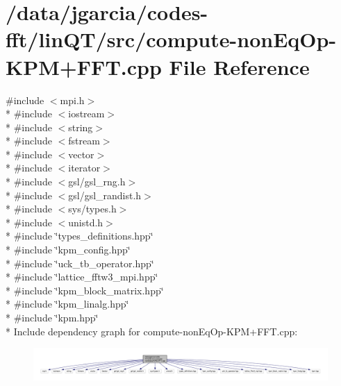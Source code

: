 \hypertarget{compute-nonEqOp-KPM_09FFT_8cpp}{}\section{/data/jgarcia/codes-\/fft/lin\+Q\+T/src/compute-\/non\+Eq\+Op-\/\+K\+P\+M+\+F\+FT.cpp File Reference}
\label{compute-nonEqOp-KPM_09FFT_8cpp}
{\ttfamily \#include $<$mpi.\+h$>$}\\*
{\ttfamily \#include $<$iostream$>$}\\*
{\ttfamily \#include $<$string$>$}\\*
{\ttfamily \#include $<$fstream$>$}\\*
{\ttfamily \#include $<$vector$>$}\\*
{\ttfamily \#include $<$iterator$>$}\\*
{\ttfamily \#include $<$gsl/gsl\+\_\+rng.\+h$>$}\\*
{\ttfamily \#include $<$gsl/gsl\+\_\+randist.\+h$>$}\\*
{\ttfamily \#include $<$sys/types.\+h$>$}\\*
{\ttfamily \#include $<$unistd.\+h$>$}\\*
{\ttfamily \#include \char`\"{}types\+\_\+definitions.\+hpp\char`\"{}}\\*
{\ttfamily \#include \char`\"{}kpm\+\_\+config.\+hpp\char`\"{}}\\*
{\ttfamily \#include \char`\"{}uck\+\_\+tb\+\_\+operator.\+hpp\char`\"{}}\\*
{\ttfamily \#include \char`\"{}lattice\+\_\+fftw3\+\_\+mpi.\+hpp\char`\"{}}\\*
{\ttfamily \#include \char`\"{}kpm\+\_\+block\+\_\+matrix.\+hpp\char`\"{}}\\*
{\ttfamily \#include \char`\"{}kpm\+\_\+linalg.\+hpp\char`\"{}}\\*
{\ttfamily \#include \char`\"{}kpm.\+hpp\char`\"{}}\\*
Include dependency graph for compute-\/non\+Eq\+Op-\/\+K\+P\+M+\+F\+FT.cpp\+:
\nopagebreak
\begin{figure}[H]
\begin{center}
\leavevmode
\includegraphics[width=350pt]{compute-nonEqOp-KPM_09FFT_8cpp__incl}
\end{center}
\end{figure}
